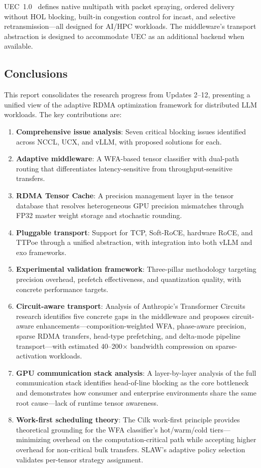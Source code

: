 \documentclass[11pt,letterpaper]{article}
\theoremstyle{definition}
\begin{document}
UEC~1.0~\cite{uec2025} defines native multipath with packet spraying, ordered delivery without HOL blocking, built-in congestion control for incast, and selective retransmission---all designed for AI/HPC workloads. The middleware's transport abstraction is designed to accommodate UEC as an additional backend when available.

\subsection{Conclusions}

This report consolidates the research progress from Updates 2--12, presenting a unified view of the adaptive RDMA optimization framework for distributed LLM workloads. The key contributions are:

\begin{enumerate}
    \item \textbf{Comprehensive issue analysis}: Seven critical blocking issues identified across NCCL, UCX, and vLLM, with proposed solutions for each.
    \item \textbf{Adaptive middleware}: A WFA-based tensor classifier with dual-path routing that differentiates latency-sensitive from throughput-sensitive transfers.
    \item \textbf{RDMA Tensor Cache}: A precision management layer in the tensor database that resolves heterogeneous GPU precision mismatches through FP32 master weight storage and stochastic rounding.
    \item \textbf{Pluggable transport}: Support for TCP, Soft-RoCE, hardware RoCE, and TTPoe through a unified abstraction, with integration into both vLLM and exo frameworks.
    \item \textbf{Experimental validation framework}: Three-pillar methodology targeting precision overhead, prefetch effectiveness, and quantization quality, with concrete performance targets.
    \item \textbf{Circuit-aware transport}: Analysis of Anthropic's Transformer Circuits research identifies five concrete gaps in the middleware and proposes circuit-aware enhancements---composition-weighted WFA, phase-aware precision, sparse RDMA transfers, head-type prefetching, and delta-mode pipeline transport---with estimated 40--200$\times$ bandwidth compression on sparse-activation workloads.
    \item \textbf{GPU communication stack analysis}: A layer-by-layer analysis of the full communication stack identifies head-of-line blocking as the core bottleneck and demonstrates how consumer and enterprise environments share the same root cause---lack of runtime tensor awareness.
    \item \textbf{Work-first scheduling theory}: The Cilk work-first principle provides theoretical grounding for the WFA classifier's hot/warm/cold tiers---minimizing overhead on the computation-critical path while accepting higher overhead for non-critical bulk transfers. SLAW's adaptive policy selection validates per-tensor strategy assignment.
\end{enumerate}
\end{document}
